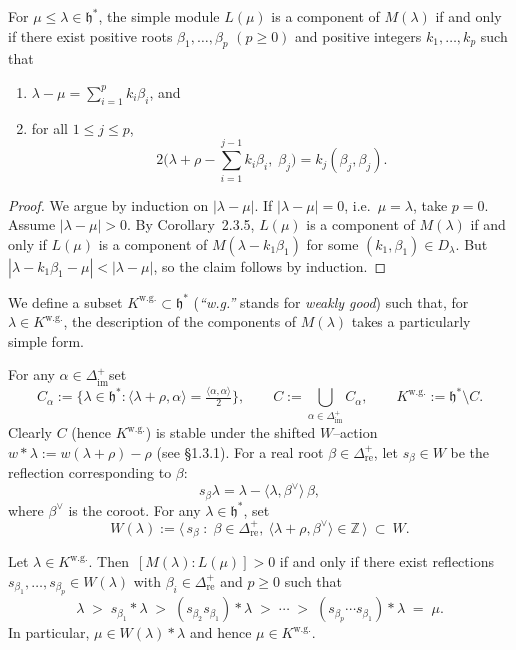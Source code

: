 \documentclass[12pt]{article}
\begin{document}
\begin{corollary}[2.3.6]
For $\mu \le \lambda \in \mathfrak{h}^*$, the simple module $L(\mu)$ is a component
of $M(\lambda)$ if and only if there exist positive roots
$\beta_1,\dots,\beta_p$ $(p\ge0)$ and positive integers $k_1,\dots,k_p$ such that
\begin{enumerate}
\item $\displaystyle \lambda-\mu=\sum_{i=1}^p k_i\beta_i$, and
\item for all $1\le j\le p$,
\[
2\bigl(\lambda+\rho-\sum_{i=1}^{j-1}k_i\beta_i,\;\beta_j\bigr)
= k_j(\beta_j,\beta_j).
\]
\end{enumerate}
\begin{proof}
We argue by induction on $|\lambda-\mu|$. If $|\lambda-\mu|=0$,
i.e.\ $\mu=\lambda$, take $p=0$. Assume $|\lambda-\mu|>0$.
By Corollary~2.3.5, $L(\mu)$ is a component of $M(\lambda)$ if and only if
$L(\mu)$ is a component of $M(\lambda-k_1\beta_1)$ for some $(k_1,\beta_1)\in D_\lambda$.
But $|\lambda-k_1\beta_1-\mu|<|\lambda-\mu|$, so the claim follows by induction.
\end{proof}
\end{corollary}

\medskip

We define a subset $K^{\mathrm{w.g.}}\subset \mathfrak{h}^*$ (\emph{``w.g.''} stands for
\emph{weakly good}) such that, for $\lambda\in K^{\mathrm{w.g.}}$, the description of
the components of $M(\lambda)$ takes a particularly simple form.

\begin{definition}[2.3.7]
For any $\alpha\in\Delta^+_{\mathrm{im}}$set
\[
C_\alpha:=\{\lambda\in\mathfrak{h}^*: \langle \lambda+\rho,\alpha\rangle
= \tfrac{\langle \alpha,\alpha\rangle}{2}\},
\qquad
C:=\bigcup_{\alpha\in\Delta^+_{\mathrm{im}}} C_\alpha,
\qquad
K^{\mathrm{w.g.}}:=\mathfrak{h}^*\setminus C.
\]
Clearly $C$ (hence $K^{\mathrm{w.g.}}$) is stable under the shifted $W$–action
$w*\lambda:=w(\lambda+\rho)-\rho$ (see \S1.3.1).
For a real root $\beta\in\Delta^+_{\mathrm{re}}$, let $s_\beta\in W$ be the reflection
corresponding to $\beta$:
\[
s_\beta\lambda=\lambda-\langle \lambda,\beta^\vee\rangle\,\beta,
\]
where $\beta^\vee$ is the coroot.
For any $\lambda\in\mathfrak{h}^*$, set
\[
W(\lambda):=\big\langle\, s_\beta \;:\; \beta\in\Delta^+_{\mathrm{re}},
\ \langle \lambda+\rho,\beta^\vee\rangle\in\mathbb{Z}\,\big\rangle
\ \subset\ W.
\]
\end{definition}

\begin{proposition}[2.3.8]
Let $\lambda\in K^{\mathrm{w.g.}}$. Then $\,[M(\lambda):L(\mu)]>0$ if and only if
there exist reflections $s_{\beta_1},\dots,s_{\beta_p}\in W(\lambda)$
with $\beta_i\in\Delta^+_{\mathrm{re}}$ and $p\ge0$ such that
\[
\lambda \;>\; s_{\beta_1}*\lambda \;>\; (s_{\beta_2}s_{\beta_1})*\lambda
\;>\; \cdots \;>\; (s_{\beta_p}\cdots s_{\beta_1})*\lambda \;=\; \mu.
\]
In particular, $\mu\in W(\lambda)*\lambda$ and hence $\mu\in K^{\mathrm{w.g.}}$.
\end{proposition}
\end{document}
